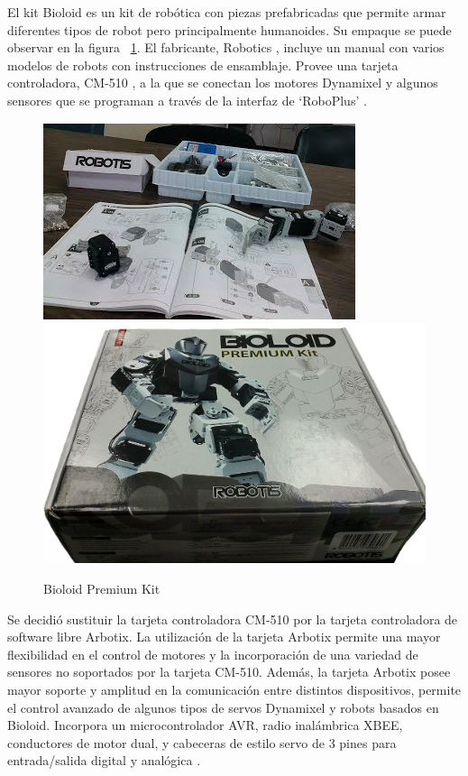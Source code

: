 El kit Bioloid es un kit de robótica con piezas prefabricadas que permite armar diferentes tipos de robot pero principalmente humanoides. Su empaque se puede observar en la figura ~\ref{fig:kit}. El fabricante, Robotics \cite{robotics}, incluye un manual  con varios modelos de robots con instrucciones de ensamblaje. Provee una tarjeta controladora, CM-510 \cite{cm510}, a la que se conectan los motores Dynamixel y algunos sensores que se programan a través de la interfaz de ‘RoboPlus’ \cite{robotics}.

\begin{figure}[hbtp]
\centering
\includegraphics[scale=0.5]{imagenes/kitAfuera.jpg}
\includegraphics[scale=0.07]{imagenes/cajaKit.jpg}
\caption{Bioloid Premium Kit}
\label{fig:kit}
\end{figure}

Se decidi\'o sustituir la tarjeta controladora CM-510 por la tarjeta controladora de software libre Arbotix. La utilización de la tarjeta Arbotix permite una mayor flexibilidad en el control de motores y la incorporación de una variedad de sensores no soportados por la tarjeta CM-510.
Además, la tarjeta Arbotix posee mayor soporte y amplitud en la comunicación entre distintos dispositivos, permite el control avanzado de algunos tipos de servos Dynamixel y robots basados en Bioloid. Incorpora un microcontrolador \gls{AVR}, radio inalámbrica \gls{XBEE}, conductores de motor dual, y cabeceras de estilo servo de 3 pines para entrada/salida digital y analógica \cite{arbotix}.

